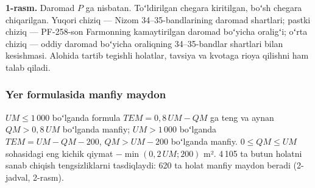 \documentclass[14pt,a4paper]{extarticle}
\begin{document}
\begin{center}
\end{center}
\textbf{1-rasm.} Daromad $P$ ga nisbatan. Toʻldirilgan chegara kiritilgan, boʻsh chegara chiqarilgan. Yuqori chiziq — Nizom 34–35-bandlarining daromad shartlari; pastki chiziq — PF-258-son Farmonning kamaytirilgan daromad boʻyicha oraligʻi; oʻrta chiziq — oddiy daromad boʻyicha oraliqning 34–35-bandlar shartlari bilan kesishmasi. Alohida tartib tegishli holatlar, tavsiya va kvotaga rioya qilishni ham talab qiladi.

\subsubsection{Yer formulasida manfiy maydon}\label{res:land}
$UM\le1\,000$ boʻlganda formula $TEM=0{,}8\,UM-QM$ ga teng va aynan $QM>0{,}8\,UM$ boʻlganda manfiy; $UM>1\,000$ boʻlganda $TEM=UM-QM-200$, $QM>UM-200$ boʻlganda manfiy. $0\le QM\le UM$ sohasidagi eng kichik qiymat $-\min(0{,}2\,UM;200)$ m². 4\,105 ta butun holatni sanab chiqish tengsizliklarni tasdiqlaydi: 620 ta holat manfiy maydon beradi (2-jadval, 2-rasm).
\end{document}
